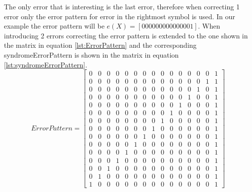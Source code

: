 \documentclass[Main]{subfiles}
\begin{document}
The only error that is interesting is the last error, therefore when correcting 1 error only the error pattern for error in the rightmost symbol is used.
In our example the error pattern will be $e(X) = [000000000000001]$.
When introducing 2 errors correcting the error pattern is extended to the one shown in the matrix in equation \ref{lst:ErrorPattern} and the corresponding syndromeErrorPattern is shown in the matrix in equation \ref{lst:syndromeErrorPattern}.
\begin{equation}
\label{lst:ErrorPattern}
ErrorPattern = 
\begin{bmatrix}
     0 &    0 &    0 &    0 &    0 &    0 &    0  &	 0 &    0 &    0 &    0 &    0 &    0 &    0   &   1\\
     0 &    0 &    0 &    0 &    0 &    0 &    0  &	 0 &    0 &    0 &    0 &    0 &    0 &    1   &   1\\
   	 0 &    0 &    0 &    0 &    0 &    0 &    0  &	 0 &    0 &    0 &    0 &    0 &    1 &    0   &   1\\
     0 &    0 &    0 &    0 &    0 &    0 &    0  &	 0 &    0 &    0 &    0 &    1 &    0 &    0   &   1\\
     0 &    0 &    0 &    0 &    0 &    0 &    0  &	 0 &    0 &    0 &    1 &    0 &    0 &    0   &   1\\
     0 &    0 &    0 &    0 &    0 &    0 &    0  &	 0 &    0 &    1 &    0 &    0 &    0 &    0   &   1\\
     0 &    0 &    0 &    0 &    0 &    0 &    0  &	 0 &    1 &    0 &    0 &    0 &    0 &    0   &   1\\
     0 &    0 &    0 &    0 &    0 &    0 &    0  &	 1 &    0 &    0 &    0 &    0 &    0 &    0   &   1\\
     0 &    0 &    0 &    0 &    0 &    0 &    1  &	 0 &    0 &    0 &    0 &    0 &    0 &    0   &   1\\
     0 &    0 &    0 &    0 &    0 &    1 &    0  &	 0 &    0 &    0 &    0 &    0 &    0 &    0   &   1\\
     0 &    0 &    0 &    0 &    1 &    0 &    0  &	 0 &    0 &    0 &    0 &    0 &    0 &    0   &   1\\
     0 &    0 &    0 &    1 &    0 &    0 &    0  &	 0 &    0 &    0 &    0 &    0 &    0 &    0   &   1\\
     0 &    0 &    1 &    0 &    0 &    0 &    0  &	 0 &    0 &    0 &    0 &    0 &    0 &    0   &   1\\
     0 &    1 &    0 &    0 &    0 &    0 &    0  &	 0 &    0 &    0 &    0 &    0 &    0 &    0   &   1\\
     1 &    0 &    0 &    0 &    0 &    0 &    0  &	 0 &    0 &    0 &    0 &    0 &    0 &    0   &   1
\end{bmatrix}
\end{equation}
\end{document}
